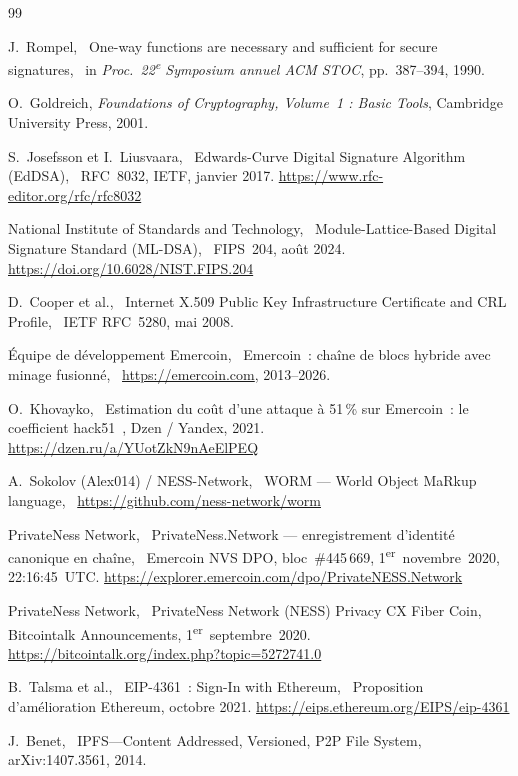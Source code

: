 \documentclass[11pt,a4paper]{article}
\begin{document}
\begin{thebibliography}{99}

  J.~Rompel,
  \og~One-way functions are necessary and sufficient for secure signatures,~\fg
  in \textit{Proc.\ 22\textsuperscript{e} Symposium annuel ACM STOC},
  pp.~387--394, 1990.

  O.~Goldreich,
  \textit{Foundations of Cryptography, Volume~1 : Basic Tools},
  Cambridge University Press, 2001.

  S.~Josefsson et I.~Liusvaara,
  \og~Edwards-Curve Digital Signature Algorithm (EdDSA),~\fg
  RFC~8032, IETF, janvier 2017.
  \url{https://www.rfc-editor.org/rfc/rfc8032}

  National Institute of Standards and Technology,
  \og~Module-Lattice-Based Digital Signature Standard (ML-DSA),~\fg
  FIPS~204, août 2024.
  \url{https://doi.org/10.6028/NIST.FIPS.204}

  D.~Cooper et al.,
  \og~Internet X.509 Public Key Infrastructure Certificate and CRL Profile,~\fg
  IETF RFC~5280, mai 2008.

  Équipe de développement Emercoin,
  \og~Emercoin~: chaîne de blocs hybride avec minage fusionné,~\fg
  \url{https://emercoin.com}, 2013--2026.

  O.~Khovayko,
  \og~Estimation du coût d'une attaque à 51\,\% sur Emercoin~: le coefficient
  hack51~\fg [en russe],
  Dzen / Yandex, 2021.
  \url{https://dzen.ru/a/YUotZkN9nAeElPEQ}

  A.~Sokolov (Alex014) / NESS-Network,
  \og~WORM --- World Object MaRkup language,~\fg
  \url{https://github.com/ness-network/worm}

  PrivateNess Network,
  \og~PrivateNess.Network --- enregistrement d'identité canonique en chaîne,~\fg
  Emercoin NVS DPO, bloc~\#445\,669,
  1\textsuperscript{er}~novembre~2020, 22:16:45~UTC.
  \url{https://explorer.emercoin.com/dpo/PrivateNESS.Network}

  PrivateNess Network,
  \og~PrivateNess Network (NESS) Privacy CX Fiber Coin,~\fg
  Bitcointalk Announcements, 1\textsuperscript{er}~septembre~2020.
  \url{https://bitcointalk.org/index.php?topic=5272741.0}

  B.~Talsma et al.,
  \og~EIP-4361~: Sign-In with Ethereum,~\fg
  Proposition d'amélioration Ethereum, octobre 2021.
  \url{https://eips.ethereum.org/EIPS/eip-4361}

  J.~Benet,
  \og~IPFS---Content Addressed, Versioned, P2P File System,~\fg
  arXiv:1407.3561, 2014.

\end{thebibliography}
\end{document}
